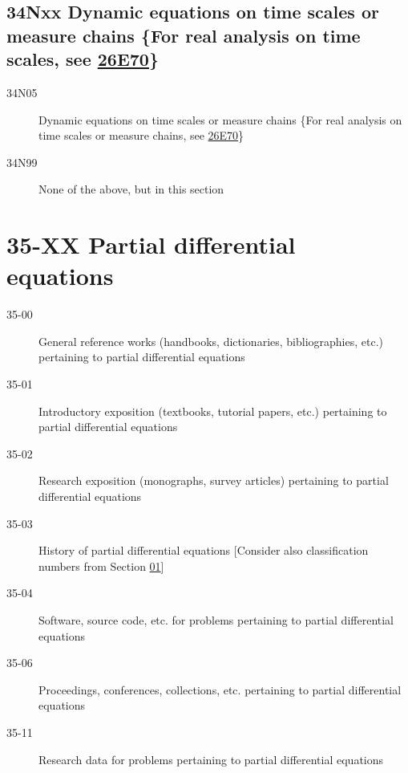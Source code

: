 \subsection*{34Nxx  Dynamic equations on time scales or measure chains \{For real analysis on time scales, see \hyperref[26E70]{26E70}\} }\label{34Nxx}
\begin{description}  
\item [34N05]\label{34N05} Dynamic equations on time scales or measure chains \{For real analysis on time scales or measure chains, see \hyperref[26E70]{26E70}\}
\item [34N99]\label{34N99} None of the above, but in this section
\end{description}
\section*{35-XX Partial differential equations}\label{35-XX}
\begin{description}
\item [35-00]\label{35-00} General reference works (handbooks, dictionaries, bibliographies, etc.) pertaining to partial differential equations
\item [35-01]\label{35-01} Introductory exposition (textbooks, tutorial papers, etc.) pertaining to partial differential equations
\item [35-02]\label{35-02} Research exposition (monographs, survey articles) pertaining to partial differential equations
\item [35-03]\label{35-03} History of partial differential equations [Consider also classification numbers from Section \hyperref[01-XX]{01}]
\item [35-04]\label{35-04} Software, source code, etc. for problems pertaining to partial differential equations
\item [35-06]\label{35-06} Proceedings, conferences, collections, etc. pertaining to partial differential equations
\item [35-11]\label{35-11} Research data for problems pertaining to partial differential equations
\end{description}
